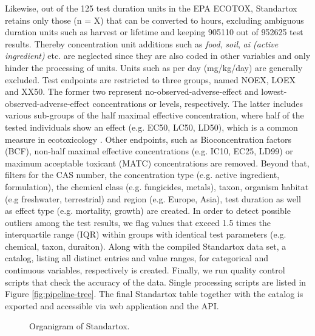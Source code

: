 Likewise, out of the 125 test duration units in the EPA ECOTOX, Standartox retains only those (n = X) that can be converted to hours, excluding ambiguous duration units such as harvest or lifetime and keeping 905110 out of 952625 test results. Thereby concentration unit additions such as \textit{food}, \textit{soil}, \textit{ai (active ingredient)} etc. are neglected since they are also coded in other variables and only hinder the processing of units. Units such as per day (mg/kg/day) are generally excluded. Test endpoints are restricted to three groups, named NOEX, LOEX and XX50. The former two represent no-observed-adverse-effect and lowest-observed-adverse-effect concentrations or levels, respectively. The latter includes various sub-groups of the half maximal effective concentration, where half of the tested individuals show an effect (e.g. EC50, LC50, LD50), which is a common measure in ecotoxicology \citep{malaj_organic_2014}. Other endpoints, such as Bioconcentration factors (BCF), non-half maximal effective concentrations (e.g. IC10, EC25, LD99) or maximum acceptable toxicant (MATC) concentrations are removed. Beyond that, filters for the CAS number, the concentration type (e.g. active ingredient, formulation), the chemical class (e.g. fungicides, metals), taxon, organism habitat (e.g freshwater, terrestrial) and region (e.g. Europe, Asia), test duration as well as effect type (e.g. mortality, growth) are created. In order to detect possible outliers among the test results, we flag values that exceed 1.5 times the interquartile range (IQR) within groups with identical test parameters (e.g. chemical, taxon, duraiton). Along with the compiled Standartox data set, a catalog, listing all distinct entries and value ranges, for categorical and continuous variables, respectively is created. Finally, we run quality control scripts that check the accuracy of the data. Single processing scripts are listed in Figure \ref{fig:pipeline-tree}. The final Standartox table together with the catalog is exported and accessible via web application and the API.

\begin{figure}
    
    \caption{Organigram of Standartox.}
    \label{fig:stx-organigram}
\end{figure}

